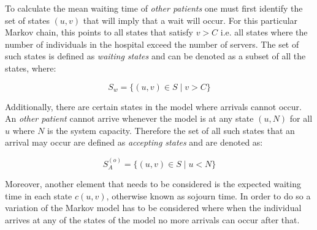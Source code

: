 To calculate the mean waiting time of \textit{other patients} one must first identify the set of states \((u, v)\) that will imply that a wait will occur. For this particular Markov chain, this points to all states that satisfy \(v > C\) i.e. all states where the number of individuals in the hospital exceed the number of servers. The set of such states is defined as \textit{waiting states} and can be denoted as a subset of all the states, where:

\begin{equation} \label{eq:waiting_states}
    S_w = \{(u, v) \in S \; | \; v > C \}    
\end{equation}

Additionally, there are certain states in the model where arrivals cannot occur. An \textit{other patient} cannot arrive whenever the model is at any state \((u, N)\) for all \(u\) where \(N\) is the system capacity. Therefore the set of all such states that an arrival may occur are defined as \textit{accepting states} and are denoted as:

\begin{equation}\label{accepting_states_others}
    S_A^{(o)} = \{(u, v) \in S \; | \; u < N \}
\end{equation}



Moreover, another element that needs to be considered is the expected waiting time in each state \( c(u,v) \), otherwise known as sojourn time. In order to do so a variation of the Markov model has to be considered where when the individual arrives at any of the states of the model no more arrivals can occur after that. 


